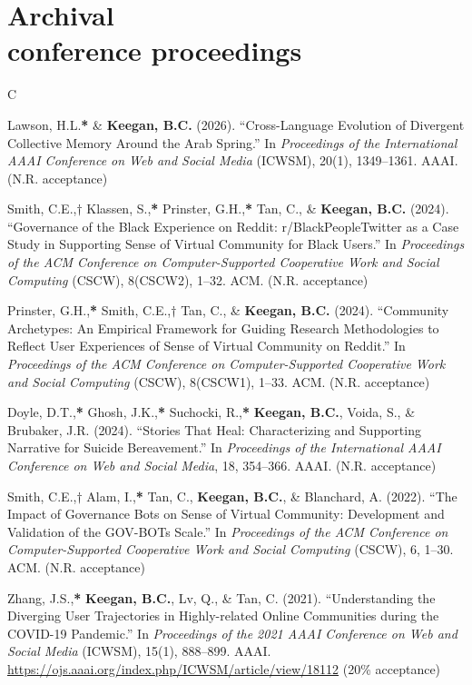 \documentclass{cv}
\begin{document}
	\section{Archival\\conference proceedings}
	\begin{entries}{C}
		\item Lawson, H.L.\textbf{*} \& \textbf{Keegan, B.C.} (2026). ``Cross-Language Evolution of Divergent Collective Memory Around the Arab Spring.'' In \textit{Proceedings of the International AAAI Conference on Web and Social Media} (ICWSM), 20(1), 1349--1361. AAAI.  (N.R. acceptance)
		\item Smith, C.E.,\textbf{$\dagger$} Klassen, S.,\textbf{*} Prinster, G.H.,\textbf{*} Tan, C., \& \textbf{Keegan, B.C.} (2024). ``Governance of the Black Experience on Reddit: r/BlackPeopleTwitter as a Case Study in Supporting Sense of Virtual Community for Black Users.'' In \textit{Proceedings of the ACM Conference on Computer-Supported Cooperative Work and Social Computing} (CSCW), 8(CSCW2), 1--32. ACM.  (N.R. acceptance)
		\item Prinster, G.H.,\textbf{*} Smith, C.E.,\textbf{$\dagger$} Tan, C., \& \textbf{Keegan, B.C.} (2024). ``Community Archetypes: An Empirical Framework for Guiding Research Methodologies to Reflect User Experiences of Sense of Virtual Community on Reddit.'' In \textit{Proceedings of the ACM Conference on Computer-Supported Cooperative Work and Social Computing} (CSCW), 8(CSCW1), 1--33. ACM.  (N.R. acceptance)
		\item Doyle, D.T.,\textbf{*} Ghosh, J.K.,\textbf{*} Suchocki, R.,\textbf{*} \textbf{Keegan, B.C.}, Voida, S., \& Brubaker, J.R. (2024). ``Stories That Heal: Characterizing and Supporting Narrative for Suicide Bereavement.'' In \textit{Proceedings of the International AAAI Conference on Web and Social Media}, 18, 354--366. AAAI.  (N.R. acceptance)
		\item Smith, C.E.,\textbf{$\dagger$} Alam, I.,\textbf{*} Tan, C., \textbf{Keegan, B.C.}, \& Blanchard, A. (2022). ``The Impact of Governance Bots on Sense of Virtual Community: Development and Validation of the GOV-BOTs Scale.'' In \textit{Proceedings of the ACM Conference on Computer-Supported Cooperative Work and Social Computing} (CSCW), 6, 1--30. ACM.  (N.R. acceptance)
		\item Zhang, J.S.,\textbf{*} \textbf{Keegan, B.C.}, Lv, Q., \& Tan, C. (2021). ``Understanding the Diverging User Trajectories in Highly-related Online Communities during the COVID-19 Pandemic.'' In \textit{Proceedings of the 2021 AAAI Conference on Web and Social Media} (ICWSM), 15(1), 888--899. AAAI. \url{https://ojs.aaai.org/index.php/ICWSM/article/view/18112} (20\% acceptance)

\end{entries}
\end{document}
